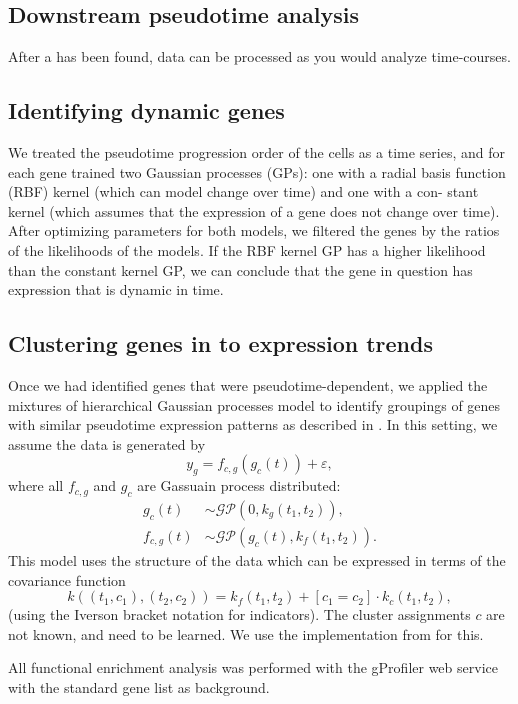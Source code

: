 \subsection{Downstream pseudotime analysis}

After a  has been found, data can be processed as you would analyze time-courses.

\subsection{Identifying dynamic genes}

We treated the pseudotime progression order of the cells as a time series, and for each gene trained two Gaussian processes (GPs): one with a radial basis function (RBF) kernel (which can model change over time) and one with a con- stant kernel (which assumes that the expression of a gene does not change over time). After optimizing parameters for both models, we filtered the genes by the ratios of the likelihoods of the models. If the RBF kernel GP has a higher likelihood than the constant kernel GP, we can conclude that the gene in question has expression that is dynamic in time.

\subsection{Clustering genes in to expression trends}

Once we had identified genes that were pseudotime-dependent, we applied the mixtures of hierarchical Gaussian processes model to identify groupings of genes with similar pseudotime expression patterns as described in \cite{Hensman2015-op}. In this setting, we assume the data is generated by
\[
    y_g = f_{c, g} ( g_c(t) ) + \varepsilon,
\]
where all \(  f_{c, g} \) and \( g_c \) are Gassuain process distributed:
\begin{align*}
    g_c(t) & \sim \mathcal{GP}(0, k_g(t_1, t_2)), \\
    f_{c, g}(t) & \sim \mathcal{GP}(g_c(t), k_f(t_1, t_2)).
\end{align*}
 This model uses the structure of the data which can be expressed in terms of the covariance function
\[
    k((t_1, c_1), (t_2, c_2)) = k_f(t_1, t_2) + [c_1 = c_2] \cdot k_c(t_1, t_2),
\]
(using the Iverson bracket notation for indicators). The cluster assignments \( c \) are not known, and need to be learned. We use the implementation from \cite{Hensman2015-op} for this.

 All functional enrichment analysis was performed with the gProfiler \cite{Reimand2011-ht} web service with the standard gene list as background.
